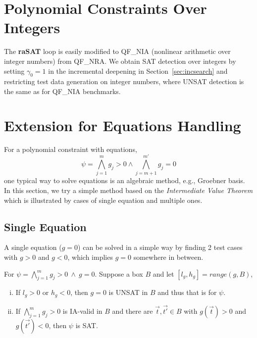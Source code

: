 \documentclass[runningheads,a4paper,oribibl]{llncs}
\begin{document}
\section{Polynomial Constraints Over Integers} \label{sec:NIA}

The {\bf raSAT} loop is easily modified to QF\_NIA (nonlinear arithmetic over
integer numbers) from QF\_NRA.
We obtain SAT detection over integers by setting $\gamma_0 = 1$ in
the incremental deepening in Section~\ref{sec:incsearch} 
and restricting test data generation on integer numbers,
where UNSAT detection is the same as for QF\_NIA benchmarks.


\section{Extension for Equations Handling} \label{sec:eq}

For a polynomial constraint with equations,
\[\psi =
\bigwedge \limits_{j=1}^m g_j > 0 \wedge
\bigwedge \limits_{j=m+1}^{m'} g_j = 0\]
one typical way to solve equations is an algebraic method, e.g., Groebner basis.
In this section, we try a simple method based on
the {\em Intermediate Value Theorem} which is illustrated by cases of single equation and multiple ones.

\subsection{Single Equation}
A single equation (${g=0}$) can be solved in a simple way by finding 2 test cases with $g > 0$ and $g < 0$, which implies 
$g=0$ somewhere in between. 

\begin{lemma} \label{lemma:ivt}
For $\psi =
\bigwedge \limits_{j=1}^m g_j > 0~\wedge~g = 0$.
Suppose a box
$B$
and
let ${[l_g, h_g] = range(g, B)}$, 
\begin{enumerate}[(i)]
\item If $l_g > 0$ or $h_g < 0$, then $g = 0$ is UNSAT in $B$ and thus that is for $\psi$.
\item If $\bigwedge \limits_{j=1}^m g_j > 0$ is IA-valid in $B$ and there are $\vec{t},\vec{t'} \in B$
  with $g(\vec{t}) > 0$ and $g(\vec{t'}) < 0$, then $\psi$ is SAT.
\end{enumerate}
\end{lemma}
\end{document}
